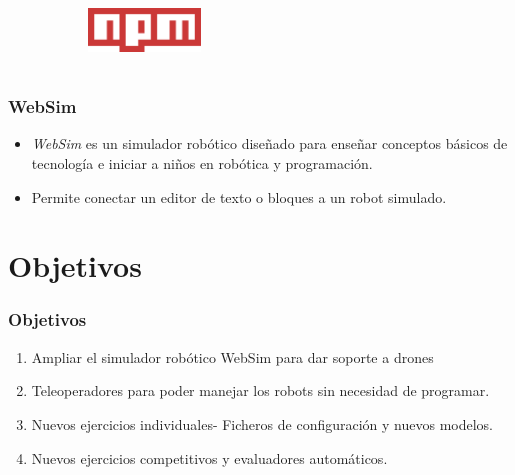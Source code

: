 \documentclass[xcolor={table}]{beamer}
\begin{document}
\begin{frame}
\begin{figure}[H]
\begin{subfigure}{\textwidth}
\label{fig:figure2_9}
\end{subfigure}\hfill
\begin{subfigure}{\textwidth}
    \includegraphics[width=3cm, height=2cm]{img/npm.png}
\label{fig:figure2_8}
\end{subfigure}\hfill

\label{fig:secuenciaDrone}
\end{figure}
		\end{frame}
			\begin{frame}
			\frametitle{WebSim}
			\begin{itemize}
			    \item \textit{WebSim} es un simulador robótico diseñado para enseñar conceptos básicos de tecnología e iniciar a niños en robótica y programación.
			    
			    \item Permite conectar un editor de texto o bloques a un robot simulado. 
			\end{itemize}
		\end{frame}
		
	\section{Objetivos}
		\begin{frame}
			\frametitle{Objetivos}
			\begin{enumerate}
				\item Ampliar el simulador robótico WebSim para dar soporte a drones
				\item Teleoperadores para poder manejar los robots sin necesidad de programar.
				\item Nuevos ejercicios individuales- Ficheros de configuración y nuevos modelos.
				\item Nuevos ejercicios competitivos y evaluadores automáticos. 
			\end{enumerate}
		\end{frame}
\end{document}
